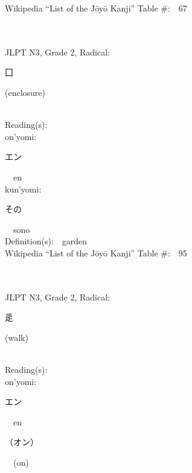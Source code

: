 \begin{multicols}{2}
Wikipedia ``List of the J\=oy\=o Kanji'' Table \#:\ \ 67 \\
\ \ \\
{\fontsize{34pt}{40pt}  }\ \ \\  %
{JLPT N3, Grade 2, Radical:\ \ {\begin{CJK}{UTF8}{min} 囗 \end{CJK}} (enclosure) } \\
Reading(s):\ \ \\
{\hspace*{1em}}on'yomi:\ \ \\
{\hspace*{2em}}{\begin{CJK}{UTF8}{min} エン \end{CJK}}\ \ en\ \ \\
{\hspace*{1em}}kun'yomi:\ \ \\
{\hspace*{2em}}{\begin{CJK}{UTF8}{min} その \end{CJK}}\ \ sono\ \ \\
Definition(s):\ \ garden \\
Wikipedia ``List of the J\=oy\=o Kanji'' Table \#:\ \ 95 \\
\ \ \\
{\fontsize{34pt}{40pt}  }\ \ \\  %
{JLPT N3, Grade 2, Radical:\ \ {\begin{CJK}{UTF8}{min} 辵 \end{CJK}} (walk) } \\
Reading(s):\ \ \\
{\hspace*{1em}}on'yomi:\ \ \\
{\hspace*{2em}}{\begin{CJK}{UTF8}{min} エン \end{CJK}}\ \ en\ \ \\
{\hspace*{2em}}{\begin{CJK}{UTF8}{min} （オン） \end{CJK}}\ \ (on)\ \ \\

\end{multicols}
